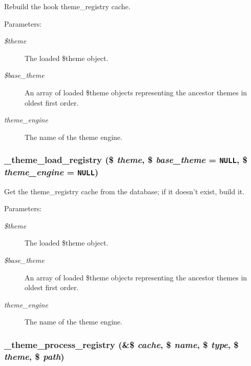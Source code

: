 Rebuild the hook theme\_\-registry cache.

\begin{Desc}
\item[Parameters:]
\begin{description}
\item[{\em \$theme}]The loaded \$theme object. \item[{\em \$base\_\-theme}]An array of loaded \$theme objects representing the ancestor themes in oldest first order. \item[{\em theme\_\-engine}]The name of the theme engine. \end{description}
\end{Desc}
\hypertarget{includes_2theme_8inc_176cb2c73e314b8a457504aade287eaf}{
\subsubsection[{\_\-theme\_\-load\_\-registry}]{\setlength{\rightskip}{0pt plus 5cm}\_\-theme\_\-load\_\-registry (\$ {\em theme}, \/  \$ {\em base\_\-theme} = {\tt NULL}, \/  \$ {\em theme\_\-engine} = {\tt NULL})}}
\label{includes_2theme_8inc_176cb2c73e314b8a457504aade287eaf}


Get the theme\_\-registry cache from the database; if it doesn't exist, build it.

\begin{Desc}
\item[Parameters:]
\begin{description}
\item[{\em \$theme}]The loaded \$theme object. \item[{\em \$base\_\-theme}]An array of loaded \$theme objects representing the ancestor themes in oldest first order. \item[{\em theme\_\-engine}]The name of the theme engine. \end{description}
\end{Desc}
\hypertarget{includes_2theme_8inc_473fae348447b091f0d8e677820d30c3}{
\subsubsection[{\_\-theme\_\-process\_\-registry}]{\setlength{\rightskip}{0pt plus 5cm}\_\-theme\_\-process\_\-registry (\&\$ {\em cache}, \/  \$ {\em name}, \/  \$ {\em type}, \/  \$ {\em theme}, \/  \$ {\em path})}}
\label{includes_2theme_8inc_473fae348447b091f0d8e677820d30c3}


